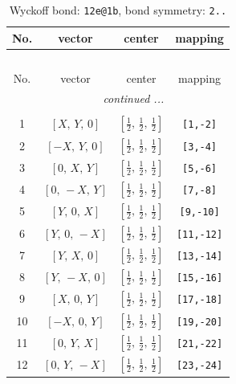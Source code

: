 \documentclass[fleqn,8pt]{jsarticle}
\begin{document}
\renewcommand{\arraystretch}{1.2}
\begin{longtable}{cccc}
\caption{Wyckoff bond: {\tt 12e@1b}, bond symmetry: {\tt 2..}}
 \\
 \hline \hline
No. & vector & center & mapping \\ \hline \endfirsthead

\multicolumn{3}{l}{\tablename\ \thetable{}} \\
 \hline \hline
No. & vector & center & mapping \\ \hline \endhead

 \hline \hline
\multicolumn{3}{r}{\footnotesize\it continued ...} \\ \endfoot

 \hline \hline
\multicolumn{3}{r}{} \\ \endlastfoot

1 & $\left[ X,\, Y,\, 0 \right]$ & $\left[ \frac{1}{2},\, \frac{1}{2},\, \frac{1}{2} \right]$ & {\tt [1,-2]} \\ \hline
2 & $\left[ - X,\, Y,\, 0 \right]$ & $\left[ \frac{1}{2},\, \frac{1}{2},\, \frac{1}{2} \right]$ & {\tt [3,-4]} \\ \hline
3 & $\left[ 0,\, X,\, Y \right]$ & $\left[ \frac{1}{2},\, \frac{1}{2},\, \frac{1}{2} \right]$ & {\tt [5,-6]} \\ \hline
4 & $\left[ 0,\, - X,\, Y \right]$ & $\left[ \frac{1}{2},\, \frac{1}{2},\, \frac{1}{2} \right]$ & {\tt [7,-8]} \\ \hline
5 & $\left[ Y,\, 0,\, X \right]$ & $\left[ \frac{1}{2},\, \frac{1}{2},\, \frac{1}{2} \right]$ & {\tt [9,-10]} \\ \hline
6 & $\left[ Y,\, 0,\, - X \right]$ & $\left[ \frac{1}{2},\, \frac{1}{2},\, \frac{1}{2} \right]$ & {\tt [11,-12]} \\ \hline
7 & $\left[ Y,\, X,\, 0 \right]$ & $\left[ \frac{1}{2},\, \frac{1}{2},\, \frac{1}{2} \right]$ & {\tt [13,-14]} \\ \hline
8 & $\left[ Y,\, - X,\, 0 \right]$ & $\left[ \frac{1}{2},\, \frac{1}{2},\, \frac{1}{2} \right]$ & {\tt [15,-16]} \\ \hline
9 & $\left[ X,\, 0,\, Y \right]$ & $\left[ \frac{1}{2},\, \frac{1}{2},\, \frac{1}{2} \right]$ & {\tt [17,-18]} \\ \hline
10 & $\left[ - X,\, 0,\, Y \right]$ & $\left[ \frac{1}{2},\, \frac{1}{2},\, \frac{1}{2} \right]$ & {\tt [19,-20]} \\ \hline
11 & $\left[ 0,\, Y,\, X \right]$ & $\left[ \frac{1}{2},\, \frac{1}{2},\, \frac{1}{2} \right]$ & {\tt [21,-22]} \\ \hline
12 & $\left[ 0,\, Y,\, - X \right]$ & $\left[ \frac{1}{2},\, \frac{1}{2},\, \frac{1}{2} \right]$ & {\tt [23,-24]} \\
\end{longtable}
\end{document}
